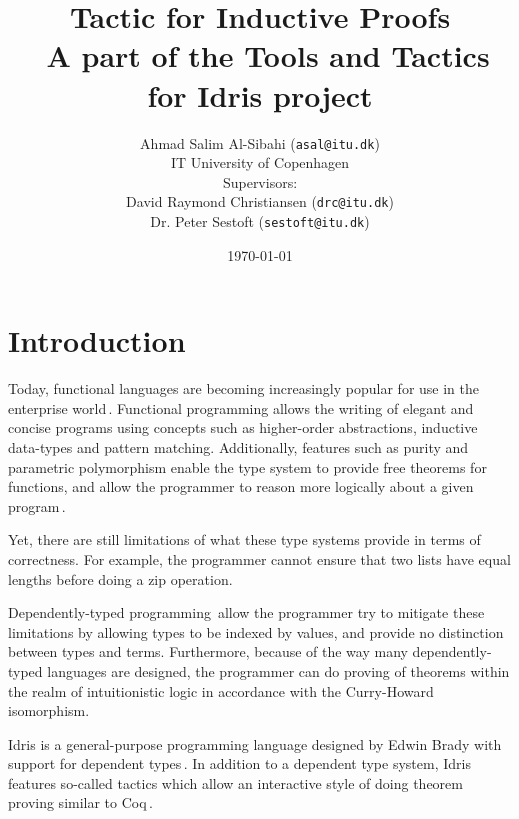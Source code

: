 \documentclass[a4paper]{article}%
\begin{document}
\title{Tactic for Inductive Proofs \\ \normalsize{A part of the Tools and Tactics for Idris project}}
\author{Ahmad Salim Al-Sibahi (\texttt{asal@itu.dk}) \\IT University of Copenhagen\\Supervisors: \\David Raymond Christiansen (\texttt{drc@itu.dk})\\ Dr. Peter Sestoft (\texttt{sestoft@itu.dk})}
\date{\today}


\maketitle
\lstset{basicstyle=\scriptsize\unicodemonofamily, captionpos=b, extendedchars=false, numbers=left, stepnumber=3, firstnumber=1, language=Haskell}



\section{Introduction}
\label{sec:Introduction}
Today, functional languages are becoming increasingly popular for use in the enterprise world\,\cite{ford2013functionalthinking}.
Functional programming allows the writing of elegant and concise programs using concepts such as higher-order abstractions, inductive data-types and pattern matching.
Additionally, features such as purity and parametric polymorphism enable the type system to provide free theorems for functions,
and allow the programmer to reason more logically about a given program\,\cite{wadler1989theorems}.

Yet, there are still limitations of what these type systems provide in terms of correctness. For example, the programmer cannot ensure that two lists have equal lengths before doing a zip operation.

Dependently-typed programming\,\cite{univalent2013hott} allow the programmer try to mitigate these limitations by allowing types to be indexed by values, and provide no distinction between types and terms.
Furthermore, because of the way many dependently-typed languages are designed, the programmer can do proving of theorems within the realm of intuitionistic logic in accordance with the Curry-Howard isomorphism\cite{mckinna2013deptypes}.

Idris is a general-purpose programming language designed by Edwin Brady with support for dependent types\,\cite{brady2013idris}. In addition to a dependent type system, Idris features so-called tactics which allow an interactive style of doing theorem proving similar to Coq\,\cite{coqteam2013coq}.
\end{document}
